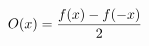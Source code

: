 \documentclass[preview]{standalone}
\begin{document}
\begin{align*}
\special{dvisvgm:raw <g id='unique000'>}O(x)=\frac{f(x)-f(-x)}{2}\special{dvisvgm:raw </g>}
\end{align*}
\end{document}
